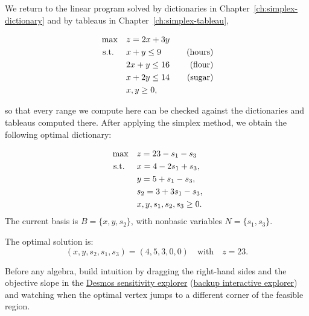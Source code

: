 We return to the linear program solved by dictionaries in Chapter~\ref{ch:simplex-dictionary} and by tableaus in Chapter~\ref{ch:simplex-tableau},
\begin{tcolorbox}[colback=algslate!6, colframe=algslate, coltitle=white, fonttitle=\bfseries, sharp corners,
    title=\textbf{Running Example}]
\[
\begin{aligned}
\max \quad & z = 2x + 3y \\
\text{ s.t. } \quad
& x + y \leq 9 \quad & \text{(hours)} \\
& 2x + y \leq 16 \quad & \text{(flour)} \\
& x + 2y \leq 14 \quad & \text{(sugar)} \\
& x, y \geq 0,
\end{aligned}
\]
\end{tcolorbox}
\noindent so that every range we compute here can be checked against the dictionaries and tableaus computed there. After applying the simplex method, we obtain the following optimal dictionary:

\begin{tcolorbox}[colback=algopt!6, colframe=algopt, coltitle=white, fonttitle=\bfseries, sharp corners,
    title=\textbf{Final Dictionary}]
\[
\begin{aligned}
\max \quad
& z = 23 - s_1 - s_3 \\
\text{ s.t. } \quad
& x = 4 - 2s_1 + s_3, \\
& y = 5 + s_1 - s_3, \\
& s_2 = 3 + 3s_1 - s_3, \\
& x, y, s_1, s_2, s_3 \geq 0.
\end{aligned}
\]
The current basis is \( B = \{x, y, s_2\} \), with nonbasic variables \( N = \{s_1, s_3\} \).

The optimal solution is:
\[
(x, y, s_2, s_1, s_3) = (4, 5, 3, 0, 0) \quad \text{with} \quad z = 23.
\]
\end{tcolorbox}

\begin{tcolorbox}[colback=sensbox!6, colframe=sensbox, coltitle=white, fonttitle=\bfseries, sharp corners,
    title={\ding{228}\ Interactive: drag the constraints}]
Before any algebra, build intuition by dragging the right-hand sides and the objective slope in the \href{https://www.desmos.com/calculator/xz1f0tdjf9}{Desmos sensitivity explorer} (\href{https://open-optimization.github.io/open-optimization-or-book/interactive-figures/lp-sensitivity-explorer.html}{backup interactive explorer}) and watching when the optimal vertex jumps to a different corner of the feasible region.
\end{tcolorbox}

